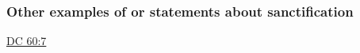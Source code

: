 	
		
	\subsubsection{Other examples of or statements about sanctification}
		\label{SANCTIFICATION-examples}
		
		\begin{compactitem}
			\item \hyperref[DC60-7]{DC 60:7}
		\end{compactitem}